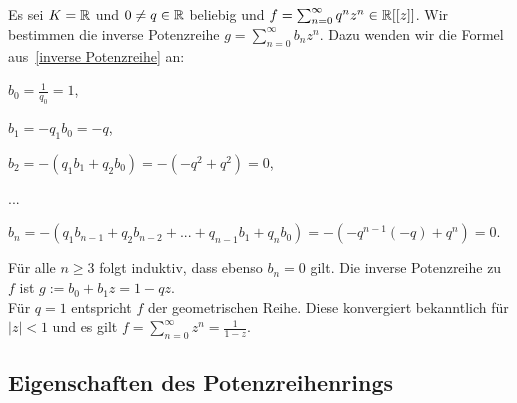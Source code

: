 %
\begin{bsp} %
Es sei $K = \mathbb{R}$ und $0\neq q \in \mathbb{R}$ beliebig und $f = \sum_{n=0}^{\infty}q^n z^n \in \mathbb{R}[[z]]$. Wir bestimmen die inverse Potenzreihe $g = \sum_{n = 0}^{\infty} b_n z^n$. Dazu wenden wir die Formel aus~\ref{inverse Potenzreihe} an:
\begin{center}
\begin{description}
\item $b_0 = \frac{1}{q_0} = 1$,
\item $b_1 = -q_1b_0 = -q$,
\item $b_2 = -\left(q_1b_1 + q_2b_0\right) = -\left(-q^2 + q^2\right) = 0$,
\item ...
\item $b_n = -\left(q_1b_{n-1} + q_2b_{n-2} + ... + q_{n-1}b_1 + q_nb_0\right) = -\left(-q^{n-1}(-q) + q^n\right) = 0$.
\end{description}
\end{center}
Für alle $n \ge 3$ folgt induktiv, dass ebenso $b_n = 0$ gilt. Die inverse Potenzreihe zu $f$ ist $g := b_0 + b_1z = 1 - qz$. \\
Für $q = 1$ entspricht $f$ der geometrischen Reihe. Diese konvergiert bekanntlich für $|z| < 1$ und es gilt $f = \sum_{n= 0}^{\infty} z^n = \frac{1}{1-z}$.
\end{bsp}
%
%
%
%
%
%
%
%
%
%
\subsection{Eigenschaften des Potenzreihenrings}

